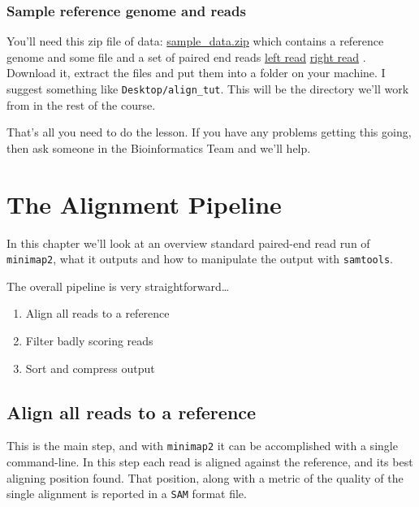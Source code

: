 \documentclass[]{book}
\providecommand{\tightlist}{%
  \setlength{\itemsep}{0pt}\setlength{\parskip}{0pt}}
\begin{document}
\hypertarget{sample-reference-genome-and-reads}{%
\subsection{Sample reference genome and reads}\label{sample-reference-genome-and-reads}}

You'll need this zip file of data: \href{https://github.com/TeamMacLean/basic_alignment/blob/master/sample_data/sample_data.zip}{sample\_data.zip} which contains a reference genome and some file and a set of paired end reads \href{https://github.com/TeamMacLean/basic_alignment/blob/master/sample_data/ecoli_left_R1.fq}{left read} \href{https://github.com/TeamMacLean/basic_alignment/blob/master/sample_data/ecoli_right_R2.fq}{right read} . Download it, extract the files and put them into a folder on your machine. I suggest something like \texttt{Desktop/align\_tut}. This will be the directory we'll work from in the rest of the course.

That's all you need to do the lesson. If you have any problems getting this going, then ask someone in the Bioinformatics Team and we'll help.

\hypertarget{intro}{%
\chapter{The Alignment Pipeline}\label{intro}}

In this chapter we'll look at an overview standard paired-end read run of \texttt{minimap2}, what it outputs and how to manipulate the output with \texttt{samtools}.

The overall pipeline is very straightforward\ldots{}

\begin{enumerate}
\def\labelenumi{\arabic{enumi}.}
\tightlist
\item
  Align all reads to a reference
\item
  Filter badly scoring reads
\item
  Sort and compress output
\end{enumerate}

\hypertarget{align-all-reads-to-a-reference}{%
\section{Align all reads to a reference}\label{align-all-reads-to-a-reference}}

This is the main step, and with \texttt{minimap2} it can be accomplished with a single command-line. In this step each read is aligned against the reference, and its best aligning position found. That position, along with a metric of the quality of the single alignment is reported in a \texttt{SAM} format file.
\end{document}
